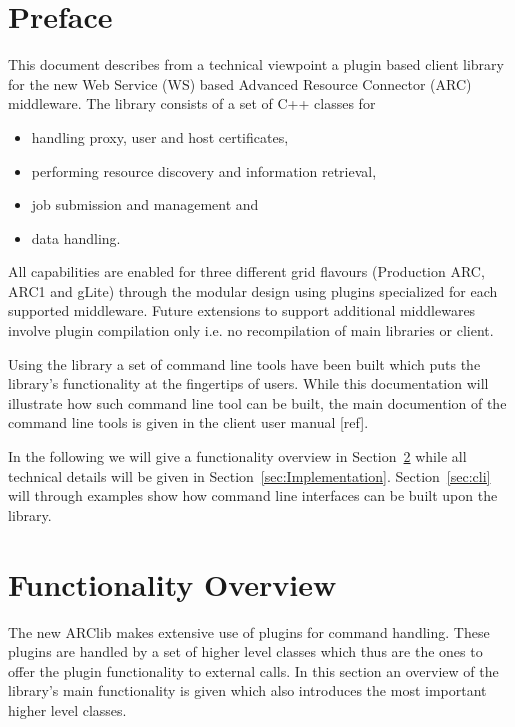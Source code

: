\documentclass{book}
\begin{document}
\tableofcontents                          %
\newpage
\chapter{Preface}
\label{sec:intro}

This document describes from a technical viewpoint a plugin based client library for the new 
Web Service (WS) based Advanced Resource Connector (ARC) middleware. The library consists of 
a set of C++ classes for 

\begin{itemize}
\item{handling proxy, user and host certificates,}
\item{performing resource discovery and information retrieval,}
\item{job submission and management and}
\item{data handling.}
\end{itemize}

All capabilities are enabled for three different grid flavours (Production ARC, ARC1 and gLite) 
through the modular design using plugins specialized for each supported middleware. Future 
extensions to support additional middlewares involve plugin compilation only i.e. no recompilation 
of main libraries or client.

Using the library a set of command line tools have been built which puts the library's functionality 
at the fingertips of users. While this documentation will illustrate how such command line tool can be 
built, the main documention of the command line tools is given in the client user manual [ref].

In the following we will give a functionality overview in Section~\ref{sec:FuncOver} while all technical 
details will be given in Section~\ref{sec:Implementation}. Section~\ref{sec:cli} will through examples 
show how command line interfaces can be built upon the library.

\chapter{Functionality Overview}
\label{sec:FuncOver}
The new ARClib makes extensive use of plugins for command handling. These plugins are handled by a set 
of higher level classes which thus are the ones to offer the plugin functionality to external calls. In 
this section an overview of the library's main functionality is given which also introduces the most 
important higher level classes.
\end{document}
